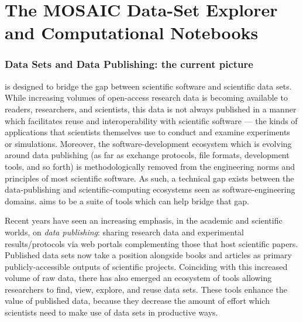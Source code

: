 \documentclass[11pt,letterpaper]{article}
\let\OldPart\part
\renewcommand{\part}[1]{\OldPart{#1}%
\vspace{-.5em}}
\newcommand{\ATextCClr}[1]{\textcolor{atcColor}{\textbf{#1}}}
\newcommand{\CRtwo}{{\resizebox{!}{7.5pt}{\ATextCClr{CR2}}}}
\newcommand{\lMOSAIC}{%
\resizebox{!}{8pt}{\AcronymText{M}}%
\resizebox{!}{6pt}{\AcronymText{OSAIC}}}
\newcommand{\textscc}[1]{{\color{orr!35!black}{{%
						\fontfamily{Cabin-TLF}\fontseries{b}\selectfont{\textsc{\scriptsize{#1}}}}}}}
\newcommand{\AcronymText}[1]{{\textscc{#1}}}
\newcommand{\PDF}{\resizebox{!}{7pt}{\AcronymText{PDF}}}
\newcommand{\p}[1]{

\vspace{1em}#1}
\begin{document}
{%


\part{The MOSAIC Data-Set Explorer and Computational Notebooks}
\section{Data Sets and Data Publishing: the current picture}

\p{\lMOSAIC{} is designed to bridge the 
gap between scientific software and 
scientific data sets.  While increasing 
volumes of open-access research data is 
becoming available to readers, researchers, 
and scientists, this data is not always 
published in a manner which facilitates 
reuse and interoperability with scientific 
software --- the kinds of applications 
that scientists themselves use to conduct 
and examine experiments or simulations.  
Moreover, the software-development ecosystem 
which is evolving around data publishing 
(as far as exchange protocols, file formats, 
development tools, and so forth) is  
methodologically removed from the engineering 
norms and principles of most scientific 
software.  As such, a technical gap 
exists between the data-publishing and 
scientific-computing ecosystems seen 
as software-engineering domains.  
\lMOSAIC{} aims to be a suite of tools 
which can help bridge that gap.}

\p{Recent years have seen an increasing emphasis, 
in the academic and scientific worlds, on 
\textit{data publishing}: sharing research 
data and experimental results/protocols via 
web portals complementing those that host 
scientific papers.  Published data sets 
now take a position alongside books and articles 
as primary publicly-accessible outputs of 
scientific projects.  Coinciding with this 
increased volume of raw data, there has 
also emerged an ecosystem of tools allowing 
researchers to find, view, explore, and 
reuse data sets.  These tools enhance the 
value of published data, because they decrease 
the amount of effort which scientists need 
to make use of data sets in productive ways.}

}
\end{document}
